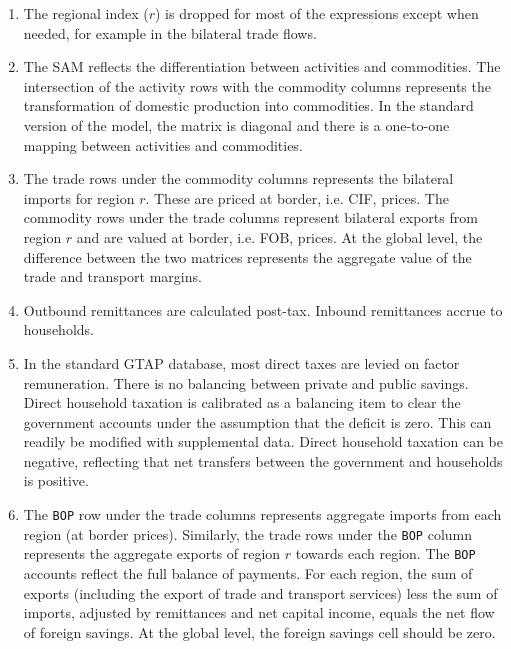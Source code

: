 \begin{enumerate}
   \item The regional index ($r$) is dropped for most of the expressions except
         when needed, for example in the bilateral trade flows.
   \item The SAM reflects the differentiation between activities and
         commodities. The intersection of the activity rows with the commodity
         columns represents the transformation of domestic production into
         commodities. In the standard version of the model, the matrix is
         diagonal and there is a one-to-one mapping between activities and
         commodities.
   \item The trade rows under the commodity columns represents the bilateral
         imports for region $r$. These are priced at border, i.e. CIF, prices.
         The commodity rows under the trade columns represent bilateral exports
         from region $r$ and are valued at border, i.e. FOB, prices. At the
         global level, the difference between the two matrices represents the
         aggregate value of the trade and transport margins.
   \item Outbound remittances are calculated post-tax. Inbound remittances
         accrue to households.
   \item In the standard GTAP database, most direct taxes are levied on factor
         remuneration. There is no balancing between private and public savings.
         Direct household taxation is calibrated as a balancing item to clear
         the government accounts under the assumption that the deficit is zero.
         This can readily be modified with supplemental data. Direct household
         taxation can be negative, reflecting that net transfers between the
         government and households is positive.
   \item The \texttt{BOP} row under the trade columns represents aggregate
         imports from each region (at border prices). Similarly, the trade rows
         under the \texttt{BOP} column represents the aggregate exports of
         region $r$ towards each region. The \texttt{BOP} accounts reflect the
         full balance of payments. For each region, the sum of exports
         (including the export of trade and transport services) less the sum of
         imports, adjusted by remittances and net capital income,  equals the
         net flow of foreign savings. At the global level, the foreign savings
         cell should be zero.
\end{enumerate}

